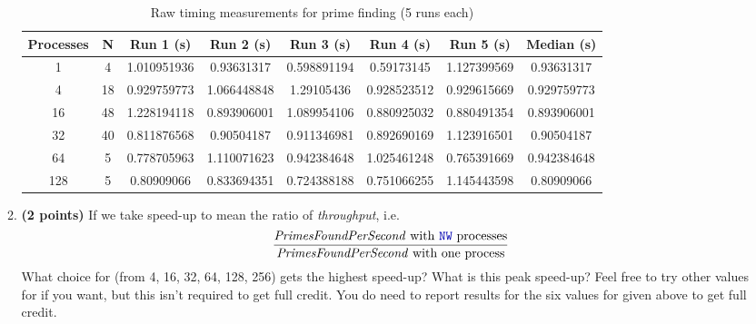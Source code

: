 \documentclass{article}
\newenvironment{answer}
{\color{blue}}
{\normalfont}
\begin{document}
\begin{enumerate}
\begin{enumerate}
  \begin{answer}
    \begin{table}[H]
    \centering
    \caption*{Raw timing measurements for prime finding (5 runs each)}
    \begin{tabular}{|c|c|c|c|c|c|c|c|}
    \hline
    \textbf{Processes} & \textbf{N} & \textbf{Run 1 (s)} & \textbf{Run 2 (s)} & \textbf{Run 3 (s)} & \textbf{Run 4 (s)} & \textbf{Run 5 (s)} & \textbf{Median (s)} \\
    \hline
    1 & 4 & 1.010951936 & 0.93631317 & 0.598891194 & 0.59173145 & 1.127399569 & 0.93631317 \\
    \hline
    4 & 18 & 0.929759773 & 1.066448848 & 1.29105436 & 0.928523512 & 0.929615669 & 0.929759773 \\
    \hline
    16 & 48 & 1.228194118 & 0.893906001 & 1.089954106 & 0.880925032 & 0.880491354 & 0.893906001 \\
    \hline
    32 & 40 & 0.811876568 & 0.90504187 & 0.911346981 & 0.892690169 & 1.123916501 & 0.90504187 \\
    \hline
    64 & 5 & 0.778705963 & 1.110071623 & 0.942384648 & 1.025461248 & 0.765391669 & 0.942384648 \\
    \hline
    128 & 5 & 0.80909066 & 0.833694351 & 0.724388188 & 0.751066255 & 1.145443598 & 0.80909066 \\
    \hline
    \end{tabular}
    \end{table}
  \end{answer}
      \item \textbf{(2 points)} If we take speed-up to mean the ratio of \emph{throughput}, i.e.
	\begin{displaymath}
	  \frac{\textrm{\textit{PrimesFoundPerSecond} with \code{NW} processes}}{
	    \textrm{\textit{PrimesFoundPerSecond} with one process}}
	\end{displaymath}
	What choice for  (from 4, 16, 32, 64, 128, 256) gets the highest speed-up?
	What is this peak speed-up?
	Feel free to try other values for  if you want, but this isn't
	required to get full credit.  You do need to report results for
	the six values for  given above to get full credit.


\end{enumerate}
\end{enumerate}
\end{document}
